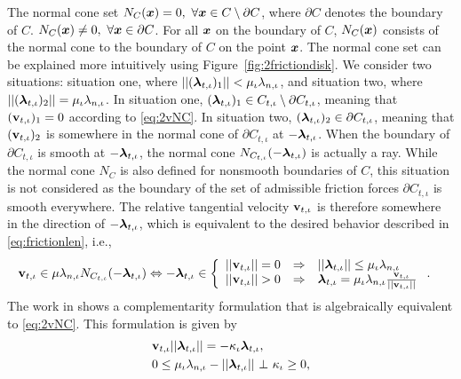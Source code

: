 \documentclass[../DC2019003Bouma.tex]{subfiles}
\begin{document}
The normal cone set $N_{C}(\xb) = 0,\ \forall\xb\in C\setminus \partial C$, where $\partial C$ denotes the boundary of $C$. $N_{C}({\boldsymbol{x}}) \neq 0,\ \forall{\boldsymbol{x}}\in \partial C$. For all ${\boldsymbol{x}}$ on the boundary of $C$, $N_{C}({\boldsymbol{x}})$ consists of the normal cone to the boundary of $C$ on the point ${\boldsymbol{x}}$. The normal cone set can be explained more intuitively using Figure~\ref{fig:2frictiondisk}. We consider two situations: situation one, where $||(\boldsymbol{\lambda}_{t,\iota})_1|| < \mu_{\iota}\lambda_{n,\iota}$, and situation two, where $||(\boldsymbol{\lambda}_{t,\iota})_2|| = \mu_{\iota}\lambda_{n,\iota}$. In situation one, $(\boldsymbol{\lambda}_{t,\iota})_1 \in C_{t,\iota}\setminus \partial C_{t,\iota}$, meaning that $(\mathbf{v}_{t,\iota})_1 = 0$ according to \eqref{eq:2vNC}. In situation two, $(\boldsymbol{\lambda}_{t,\iota})_2 \in \partial C_{t,\iota}$, meaning that $(\mathbf{v}_{t,\iota})_2$ is somewhere in the normal cone of $\partial C_{t,\iota}$ at $-\boldsymbol{\lambda}_{t,\iota}$. When the boundary of $\partial C_{t,\iota}$ is smooth at $-\boldsymbol{\lambda}_{t,\iota}$, the normal cone $N_{C_{t,\iota}}(-\boldsymbol{\lambda}_{t,\iota})$ is actually a ray. While the normal cone $N_C$ is also defined for nonsmooth boundaries of $C$, this situation is not considered as the boundary of the set of admissible friction forces $\partial C_{t,\iota}$ is smooth everywhere. The relative tangential velocity $\mathbf{v}_{t,\iota}$ is therefore somewhere in the direction of $-\boldsymbol{\lambda}_{t,\iota}$, which is equivalent to the desired behavior described in \eqref{eq:frictionlen}, i.e.,
\begin{align}
\vbf_{t,\iota} &\in \mu\lambda_{n,\iota}N_{C_{t,\iota}}(-\lambdab_{t,\iota}) \Leftrightarrow -\lambdab_{t,\iota} \in \left\{ \begin{array}{lll}
||\vbf_{t,\iota}||=0 & \Rightarrow & ||\lambdab_{t,\iota}||\leq\mu_{\iota}\lambda_{n,\iota}\\
||\vbf_{t,\iota}||>0 & \Rightarrow & \lambdab_{t,\iota} = \mu_{\iota}\lambda_{n,\iota}\frac{\vbf_{t,\iota}}{||\vbf_{t,\iota}||}
\end{array}\right. .\label{eq:frictiondir}
\end{align}
%
The work in \cite{Anitescu2006} shows a complementarity formulation that is algebraically equivalent to \eqref{eq:2vNC}. This formulation is given by
\begin{align}
&\vbf_{t,\iota}||\lambdab_{t,\iota}|| = -\kappa_{\iota}\lambdab_{t,\iota},\label{eq:coulomb1}\\
&0\leq \mu_{\iota}\lambda_{n,\iota} - ||\lambdab_{t,\iota}||\ \bot\ \kappa_{\iota} \geq 0,\label{eq:coulomb2}
\end{align}
\end{document}
